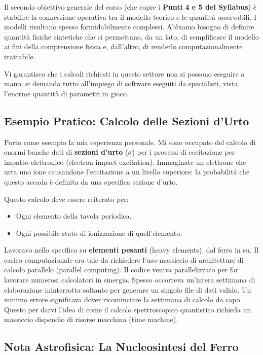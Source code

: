 Il secondo obiettivo generale del corso (che copre i \textbf{Punti 4 e 5 del Syllabus}) è stabilire la connessione operativa tra il modello teorico e le quantità osservabili.
I modelli risultano spesso formidabilmente complessi. Abbiamo bisogno di definire quantità fisiche sintetiche che ci permettano, da un lato, di semplificare il modello ai fini della comprensione fisica e, dall'altro, di renderlo computazionalmente trattabile.

Vi garantisco che i calcoli richiesti in questo settore non si possono eseguire a mano; si demanda tutto all'impiego di software eseguiti da specialisti, vista l'enorme quantità di parametri in gioco.

    \subsection{Esempio Pratico: Calcolo delle Sezioni d'Urto}
    
    Porto come esempio la mia esperienza personale. Mi sono occupato del calcolo di enormi banche dati di \textbf{sezioni d'urto} ($\sigma$) per i processi di eccitazione per impatto elettronico (electron impact excitation). Immaginate un elettrone che urta uno ione causandone l'eccitazione a un livello superiore: la probabilità che questo accada è definita da una specifica sezione d'urto.
    
    Questo calcolo deve essere reiterato per:
    \begin{itemize}
        \item Ogni elemento della tavola periodica.
        \item Ogni possibile stato di ionizzazione di quell'elemento.
    \end{itemize}
    
    Lavoravo nello specifico su \textbf{elementi pesanti} (heavy elements), dal ferro in su. Il carico computazionale era tale da richiedere l'uso massiccio di architetture di calcolo parallelo (parallel computing). Il codice veniva parallelizzato per far lavorare numerosi calcolatori in sinergia. Spesso occorreva un'intera settimana di elaborazione ininterrotta soltanto per generare un singolo file di dati valido. Un minimo errore significava dover ricominciare la settimana di calcolo da capo. Questo per darvi l'idea di come il calcolo spettroscopico quantistico richieda un massiccio dispendio di risorse macchina (time machine).
    
    \subsection{Nota Astrofisica: La Nucleosintesi del Ferro}
    
